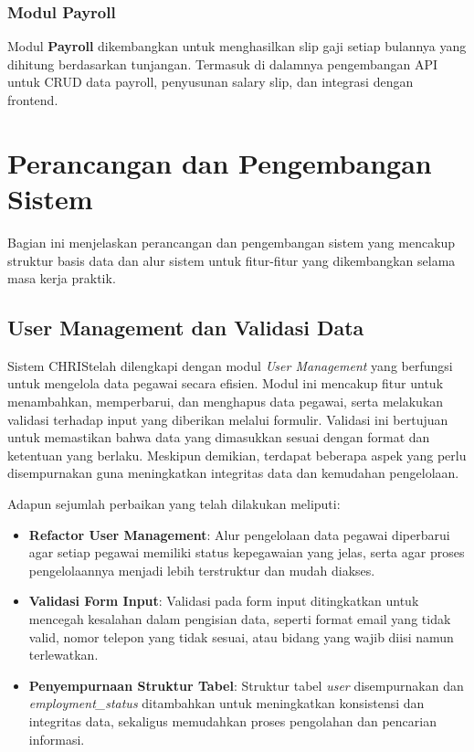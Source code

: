 \subsubsection{Modul Payroll}

Modul \textbf{Payroll} dikembangkan untuk menghasilkan slip gaji setiap bulannya yang dihitung berdasarkan tunjangan. Termasuk di dalamnya pengembangan API untuk CRUD data payroll, penyusunan salary slip, dan integrasi dengan frontend.



\section{Perancangan dan Pengembangan Sistem}
Bagian ini menjelaskan perancangan dan pengembangan sistem yang mencakup struktur basis data dan alur sistem untuk fitur-fitur yang dikembangkan selama masa kerja praktik.

\subsection{User Management dan Validasi Data}
Sistem CHRIS\@ telah dilengkapi dengan modul \textit{User Management} yang berfungsi untuk mengelola data pegawai secara efisien. Modul ini mencakup fitur untuk menambahkan, memperbarui, dan menghapus data pegawai, serta melakukan validasi terhadap input yang diberikan melalui formulir. Validasi ini bertujuan untuk memastikan bahwa data yang dimasukkan sesuai dengan format dan ketentuan yang berlaku. Meskipun demikian, terdapat beberapa aspek yang perlu disempurnakan guna meningkatkan integritas data dan kemudahan pengelolaan.

Adapun sejumlah perbaikan yang telah dilakukan meliputi:
\begin{itemize}
    \item \textbf{Refactor User Management}: Alur pengelolaan data pegawai diperbarui agar setiap pegawai memiliki status kepegawaian yang jelas, serta agar proses pengelolaannya menjadi lebih terstruktur dan mudah diakses.
    \item \textbf{Validasi Form Input}: Validasi pada form input ditingkatkan untuk mencegah kesalahan dalam pengisian data, seperti format email yang tidak valid, nomor telepon yang tidak sesuai, atau bidang yang wajib diisi namun terlewatkan.
    \item \textbf{Penyempurnaan Struktur Tabel}: Struktur tabel \textit{user} disempurnakan dan \textit{employment\_status} ditambahkan untuk meningkatkan konsistensi dan integritas data, sekaligus memudahkan proses pengolahan dan pencarian informasi.
\end{itemize}

